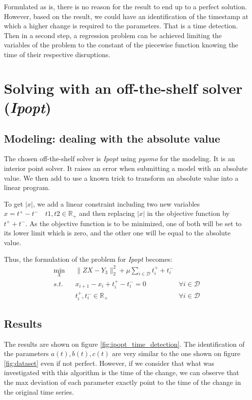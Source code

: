 \documentclass[11pt]{article}
\begin{document}
        Formulated as is, there is no reason for the result to end up to a perfect solution. However, based on the result, we could have an identification of the timestamp at which a higher change is required to the parameters. That is a time detection. Then in a second step, a regression problem can be achieved limiting the variables of the problem to the constant of the piecewise function knowing the time of their respective disruptions.

\section{Solving with an off-the-shelf solver (\emph{Ipopt})}
    \subsection{Modeling: dealing with the absolute value}
    The chosen off-the-shelf solver is \emph{Ipopt} using \emph{pyomo} for the modeling. It is an interior point solver. It raises an error when submitting a model with an absolute value. We then add to use a known trick to transform an absolute value into a linear program.

    To get $|x|$, we add a linear constraint including two new variables $x = t^+ - t^- \quad t1,t2 \in \mathbb{R}_+$ and then replacing $|x|$ in the objective function by $t^+ + t^-$. As the objective function is to be minimized, one of both will be set to its lower limit which is zero, and the other one will be equal to the absolute value.
    
    Thus, the formulation of the problem for \emph{Ipopt} becomes:
    \begin{equation*}
        \begin{aligned}
            \min_{X}&{\lVert ZX - Y_3 \rVert^2_2 + \mu\sum_{i \in \mathcal{D}}{t^+_i + t^-_i}} \\
            s.t. \quad &x_{i + 1} - x_{i} + t_i^+ - t_i^- = 0 \quad &\forall i \in \mathcal{D} \\
            &t_i^+, t_i^- \in \mathbb{R}_+ &\forall i \in \mathcal{D}
        \end{aligned}
    \end{equation*}

    \subsection{Results}
    The results are shown on figure \ref{fig:ipopt_time_detection}. The identification of the parameters $a(t), b(t), c(t)$ are very similar to the one shown on figure \ref{fig:dataset} even if not perfect. However, if we consider that what was investigated with this algorithm is the time of the change, we can observe that the max deviation of each parameter exactly point to the time of the change in the original time series.
\end{document}
